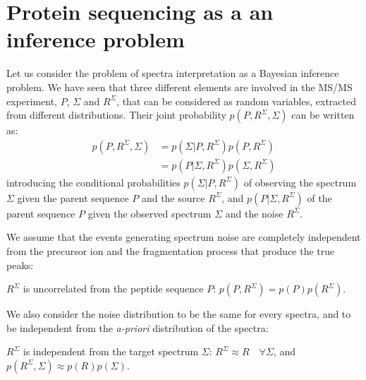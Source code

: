
\section{Protein sequencing as a an inference problem}


 Let us consider the problem of spectra interpretation as a Bayesian inference
problem. We have seen that three different elements are involved in the MS/MS
experiment, 
$P$, $\Sigma$ and $R^\Sigma$, that can be considered as random variables,
extracted from different distributions.
Their joint probability  $p(P,R^\Sigma, \Sigma)$ can be
written as: %
\begin{align}
p(P,R^\Sigma,\Sigma)&=p(\Sigma \vert P,R^\Sigma)p(P, R^\Sigma)\\
&= p(P \vert \Sigma, R^\Sigma)p(\Sigma, R^\Sigma)
\label{eq:p1}
\end{align}
introducing the conditional probabilities $p(\Sigma \vert P,R^\Sigma)$ of
observing the spectrum $\Sigma$ given the parent sequence $P$ and the source
$R^\Sigma$, and $p(P \vert \Sigma,R^\Sigma)$ of the parent sequence $P$ given
the observed spectrum $\Sigma$  and the noise  $R^\Sigma$.

We assume that the events generating spectrum noise are completely independent from
the precursor ion  and the fragmentation process that produce the true peaks:
\begin{hypothesis}
$R^\Sigma$ is uncorrelated from the peptide sequence $P$:
$p(P,R^\Sigma)=p(P)p(R^\Sigma)$.
\label{hyp:p-r}
\end{hypothesis}

We also consider the noise distribution to be the same for every spectra, and to
be independent from the \emph{a-priori} distribution of the spectra:
\begin{hypothesis}
$R^\Sigma$ is independent from the target spectrum
$\Sigma$: $R^\Sigma\approx R\quad \forall \Sigma$, and
$p(R^\Sigma,\Sigma)\approx p(R)p(\Sigma)$.
\label{hyp:r-s}
\end{hypothesis}

